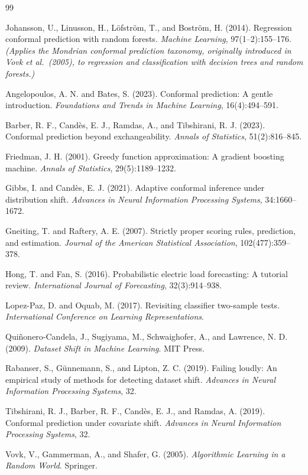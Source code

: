 \documentclass{article}
\begin{document}
\begin{thebibliography}{99}

Johansson, U., Linusson, H., L\"{o}fstr\"{o}m, T., and Bostr\"{o}m, H.
(2014).
Regression conformal prediction with random forests.
\emph{Machine Learning}, 97(1--2):155--176.
\textit{(Applies the Mondrian conformal prediction taxonomy, originally
introduced in Vovk et al.\ (2005), to regression and classification with
decision trees and random forests.)}

Angelopoulos, A. N. and Bates, S. (2023).
Conformal prediction: A gentle introduction.
\emph{Foundations and Trends in Machine Learning}, 16(4):494--591.

Barber, R. F., Cand\`{e}s, E. J., Ramdas, A., and Tibshirani, R. J. (2023).
Conformal prediction beyond exchangeability.
\emph{Annals of Statistics}, 51(2):816--845.

Friedman, J. H. (2001).
Greedy function approximation: A gradient boosting machine.
\emph{Annals of Statistics}, 29(5):1189--1232.

Gibbs, I. and Cand\`{e}s, E. J. (2021).
Adaptive conformal inference under distribution shift.
\emph{Advances in Neural Information Processing Systems}, 34:1660--1672.

Gneiting, T. and Raftery, A. E. (2007).
Strictly proper scoring rules, prediction, and estimation.
\emph{Journal of the American Statistical Association}, 102(477):359--378.

Hong, T. and Fan, S. (2016).
Probabilistic electric load forecasting: A tutorial review.
\emph{International Journal of Forecasting}, 32(3):914--938.

Lopez-Paz, D. and Oquab, M. (2017).
Revisiting classifier two-sample tests.
\emph{International Conference on Learning Representations}.

Qui\~{n}onero-Candela, J., Sugiyama, M., Schwaighofer, A., and Lawrence, N. D.
(2009).
\emph{Dataset Shift in Machine Learning}.
MIT Press.

Rabanser, S., G\"{u}nnemann, S., and Lipton, Z. C. (2019).
Failing loudly: An empirical study of methods for detecting dataset shift.
\emph{Advances in Neural Information Processing Systems}, 32.

Tibshirani, R. J., Barber, R. F., Cand\`{e}s, E. J., and Ramdas, A. (2019).
Conformal prediction under covariate shift.
\emph{Advances in Neural Information Processing Systems}, 32.

Vovk, V., Gammerman, A., and Shafer, G. (2005).
\emph{Algorithmic Learning in a Random World}.
Springer.

\end{thebibliography}
\end{document}

